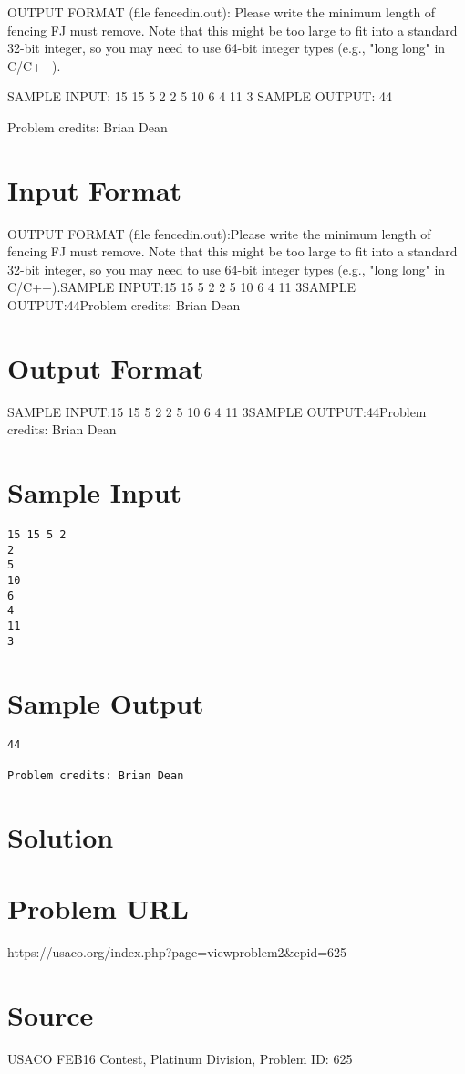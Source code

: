 \documentclass[12pt]{article}
\begin{document}
OUTPUT FORMAT (file fencedin.out):
Please write the minimum length of fencing FJ must remove.  Note that this might
be too large to fit into a standard 32-bit integer, so you may need to
use 64-bit integer types (e.g., "long long" in C/C++).

SAMPLE INPUT:
15 15 5 2
2
5
10
6
4
11
3
SAMPLE OUTPUT: 
44

Problem credits: Brian Dean



\section*{Input Format}
OUTPUT FORMAT (file fencedin.out):Please write the minimum length of fencing FJ must remove.  Note that this might
be too large to fit into a standard 32-bit integer, so you may need to
use 64-bit integer types (e.g., "long long" in C/C++).SAMPLE INPUT:15 15 5 2
2
5
10
6
4
11
3SAMPLE OUTPUT:44Problem credits: Brian Dean

\section*{Output Format}
SAMPLE INPUT:15 15 5 2
2
5
10
6
4
11
3SAMPLE OUTPUT:44Problem credits: Brian Dean

\section*{Sample Input}
\begin{verbatim}
15 15 5 2
2
5
10
6
4
11
3
\end{verbatim}

\section*{Sample Output}
\begin{verbatim}
44

Problem credits: Brian Dean
\end{verbatim}

\section*{Solution}


\section*{Problem URL}
https://usaco.org/index.php?page=viewproblem2&cpid=625

\section*{Source}
USACO FEB16 Contest, Platinum Division, Problem ID: 625
\end{document}
